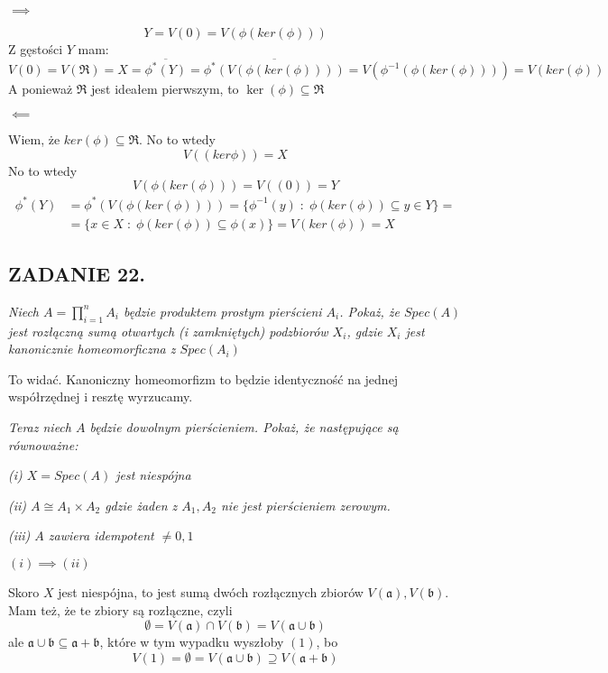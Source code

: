 \documentclass{article}
\begin{document}
$\implies$

$$Y=V(0)=V(\phi(ker(\phi)))$$
Z gęstości $Y$ mam:
$$V(0)=V(\mathfrak{R})=X=\overline{\phi^*(Y)}=\overline{\phi^*(V(\phi(ker(\phi))))}=V(\phi^{-1}(\phi(ker(\phi))))=V(ker(\phi))$$
A ponieważ $\mathfrak{R}$ jest ideałem pierwszym, to $\ker(\phi)\subseteq\mathfrak{R}$

$\impliedby$

Wiem, że $ker(\phi)\subseteq\mathfrak{R}$. No to wtedy
$$V((ker\phi))=X$$
No to wtedy
$$V(\phi(ker(\phi)))=V((0))=Y$$
\begin{align*}
    \phi^*(Y)&=\phi^*(V(\phi(ker(\phi))))=\{\phi^{-1}(y)\;:\;\phi(ker(\phi))\subseteq y\in Y\}=\\
    &=\{x\in X\;:\;\phi(ker(\phi))\subseteq\phi(x)\}=V(ker(\phi))=X
\end{align*}

\subsection*{ZADANIE 22.}
\emph{\color{yellow}Niech $A=\prod\limits_{i=1}^nA_i$ będzie produktem prostym pierścieni $A_i$. Pokaż, że $Spec(A)$ jest rozłączną sumą otwartych (i zamkniętych) podzbiorów $X_i$, gdzie $X_i$ jest kanonicznie homeomorficzna z $Spec(A_i)$}

To widać. Kanoniczny homeomorfizm to będzie identyczność na jednej współrzędnej i resztę wyrzucamy. 

\emph{\color{pink}Teraz niech $A$ będzie dowolnym pierścieniem. Pokaż, że następujące są równoważne:}

\emph{(i) $X=Spec(A)$ jest niespójna}

\emph{(ii) $A\cong A_1\times A_2$ gdzie żaden z $A_1,A_2$ nie jest pierścieniem zerowym.}

\emph{(iii) $A$ zawiera idempotent $\neq0,1$}
\medskip

$(i)\implies (ii)$

Skoro $X$ jest niespójna, to jest sumą dwóch rozłącznych zbiorów $V(\mathfrak{a}), V(\mathfrak{b})$.  Mam też, że te zbiory są rozłączne, czyli
$$\emptyset=V(\mathfrak{a})\cap V(\mathfrak{b})=V(\mathfrak{a}\cup\mathfrak{b})$$
ale $\mathfrak{a}\cup\mathfrak{b}\subseteq\mathfrak{a}+\mathfrak{b}$, które w tym wypadku wyszłoby $(1)$, bo
$$V(1)=\emptyset=V(\mathfrak{a}\cup\mathfrak{b})\supseteq V(\mathfrak{a}+\mathfrak{b})$$
\end{document}
